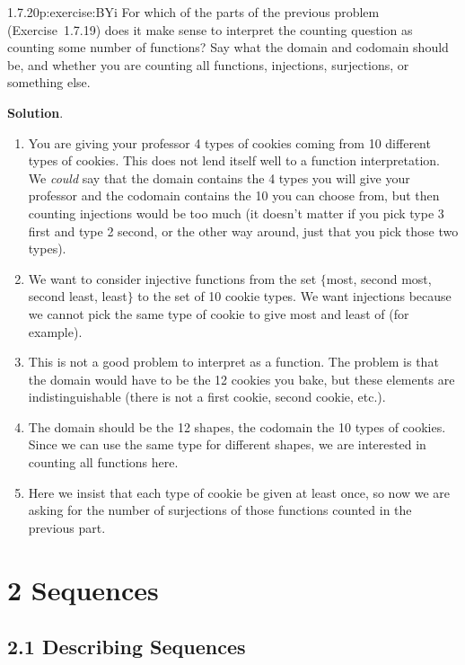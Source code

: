 \documentclass[twoside,11pt,]{book}
\newcommand{\blocktitlefont}{\relax}
\numberwithin{equation}{chapter}
\begin{document}
\begin{divisionsolution}{1.7.20}{}{p:exercise:BYi}%
For which of the parts of the previous problem (Exercise~1.7.19) does it make sense to interpret the counting question as counting some number of functions? Say what the domain and codomain should be, and whether you are counting all functions, injections, surjections, or something else.%
\par\smallskip%
\noindent\textbf{\blocktitlefont Solution}.\quad{}%
\begin{enumerate}[label=(\alph*)]
\item{}You are giving your professor 4 types of cookies coming from 10 different types of cookies. This does not lend itself well to a function interpretation. We \emph{could} say that the domain contains the 4 types you will give your professor and the codomain contains the 10 you can choose from, but then counting injections would be too much (it doesn't matter if you pick type 3 first and type 2 second, or the other way around, just that you pick those two types).%
\item{}We want to consider injective functions from the set \(\{\)most, second most, second least, least\(\}\) to the set of 10 cookie types. We want injections because we cannot pick the same type of cookie to give most and least of (for example).%
\item{}This is not a good problem to interpret as a function. The problem is that the domain would have to be the 12 cookies you bake, but these elements are indistinguishable (there is not a first cookie, second cookie, etc.).%
\item{}The domain should be the 12 shapes, the codomain the 10 types of cookies. Since we can use the same type for different shapes, we are interested in counting all functions here.%
\item{}Here we insist that each type of cookie be given at least once, so now we are asking for the number of surjections of those functions counted in the previous part.%
\end{enumerate}
%
\end{divisionsolution}%
\chapter*{2 Sequences}
\section*{2.1 Describing Sequences}
\end{document}
